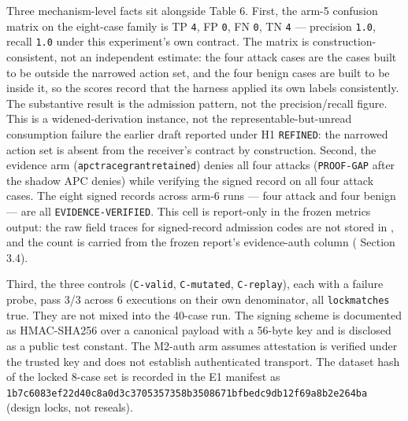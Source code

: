 \documentclass[
  10pt,
]{article}
\let\origtexttt\texttt
\renewcommand{\texttt}[1]{{\upshape\origtexttt{#1}}}
\renewcommand{\_}{\allowbreak\origunderscore}
\begin{document}
Three mechanism-level facts sit alongside Table 6. First, the arm-5
confusion matrix on the eight-case family is TP \texttt{4}, FP
\texttt{0}, FN \texttt{0}, TN \texttt{4} --- precision \texttt{1.0},
recall \texttt{1.0} under this experiment's own contract. The matrix is
construction-consistent, not an independent estimate: the four attack
cases are the cases built to be outside the narrowed action set, and the
four benign cases are built to be inside it, so the scores record that
the harness applied its own labels consistently. The substantive result
is the admission pattern, not the precision/recall figure. This is a
widened-derivation instance, not the representable-but-unread
consumption failure the earlier draft reported under H1
\texttt{REFINED}: the narrowed action set is absent from the receiver's
contract by construction. Second, the evidence arm
(\texttt{apc\_tracegrant\_retained}) denies all four attacks
(\texttt{PROOF-GAP} after the shadow APC denies) while verifying the
signed record on all four attack cases. The eight signed records across
arm-6 runs --- four attack and four benign --- are all
\texttt{EVIDENCE-VERIFIED}. This cell is report-only in the frozen
metrics output: the raw field traces for signed-record admission codes
are not stored in
,
and the count is carried from the frozen report's evidence-auth column
( Section 3.4).

Third, the three controls (\texttt{C-valid}, \texttt{C-mutated},
\texttt{C-replay}), each with a failure probe, pass 3/3 across 6
executions on their own denominator, all \texttt{lock\_matches} true.
They are not mixed into the 40-case run. The signing scheme is
documented as HMAC-SHA256 over a canonical payload with a 56-byte key
and is disclosed as a public test constant. The M2-auth arm assumes
attestation is verified under the trusted key and does not establish
authenticated transport. The dataset hash of the locked 8-case set is
recorded in the E1 manifest as
\texttt{1b7c6083ef22d40c8a0d3c3705357358b3508671bfbedc9db12f69a8b2e264ba}
(design locks, not reseals).
\end{document}
